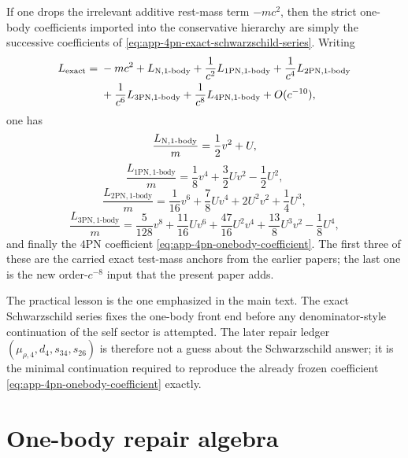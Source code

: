 \documentclass[11pt]{article}
\begin{document}
If one drops the irrelevant additive rest-mass term $-mc^2$, then the strict
one-body coefficients imported into the conservative hierarchy are simply the
successive coefficients of
\eqref{eq:app-4pn-exact-schwarzschild-series}.  Writing
\[
\begin{aligned}
L_{\rm exact}
={}&
-mc^2
+L_{\rm N,1\text{-body}}
+\frac{1}{c^2}L_{1\mathrm{PN},1\text{-body}}
+\frac{1}{c^4}L_{2\mathrm{PN},1\text{-body}}
\\
&+
\frac{1}{c^6}L_{3\mathrm{PN},1\text{-body}}
+\frac{1}{c^8}L_{4\mathrm{PN},1\text{-body}}
+O(c^{-10}),
\end{aligned}
\]
one has
\begin{equation}
\frac{L_{\rm N,1\text{-body}}}{m}
=
\frac12 v^2+U,
\label{eq:app-4pn-newtonian-onebody}
\end{equation}
\begin{equation}
\frac{L_{1\mathrm{PN},1\text{-body}}}{m}
=
\frac18 v^4
+\frac32 Uv^2
-\frac12 U^2,
\label{eq:app-4pn-1pn-onebody}
\end{equation}
\begin{equation}
\frac{L_{2\mathrm{PN},1\text{-body}}}{m}
=
\frac1{16}v^6
+\frac78 Uv^4
+2U^2v^2
+\frac14 U^3,
\label{eq:app-4pn-2pn-onebody}
\end{equation}
\begin{equation}
\frac{L_{3\mathrm{PN},1\text{-body}}}{m}
=
\frac5{128}v^8
+\frac{11}{16}Uv^6
+\frac{47}{16}U^2v^4
+\frac{13}{8}U^3v^2
-\frac18 U^4,
\label{eq:app-4pn-3pn-onebody}
\end{equation}
and finally the $4$PN coefficient
\eqref{eq:app-4pn-onebody-coefficient}.  The first three of these are the
carried exact test-mass anchors from the earlier papers; the last one is the new
order-$c^{-8}$ input that the present paper adds.

The practical lesson is the one emphasized in the main text.  The exact
Schwarzschild series fixes the one-body front end before any denominator-style
continuation of the self sector is attempted.  The later repair ledger
\((\mu_{\rho,4},d_4,s_{34},s_{26})\) is therefore not a guess about the
Schwarzschild answer; it is the minimal continuation required to reproduce the
already frozen coefficient
\eqref{eq:app-4pn-onebody-coefficient} exactly.


\section{One-body repair algebra}
\label{app:onebody-repair}
\end{document}
